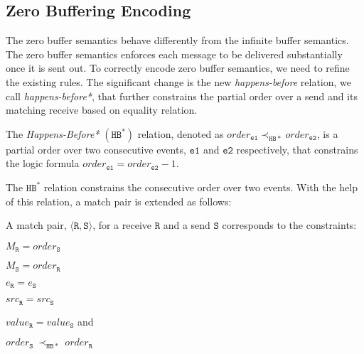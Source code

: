 





\subsection{Zero Buffering Encoding}
The zero buffer semantics behave differently from the infinite buffer semantics.  The zero buffer semantics enforces each message to be delivered substantially once it is sent out. To correctly encode zero buffer semantics, we need to refine the existing rules. The significant change is the new \emph{happens-before} relation, we call \textit{happens-before*}, that further constrains the partial order over a send and its matching receive based on equality relation. 

\begin{definition}
The \emph{Happens-Before*} $(\mathtt{HB^*})$ relation, denoted as
$\mathit{order}_\mathtt{e1} \mathrm{\prec_\mathtt{HB*}} \mathit{order}_\mathtt{e2}$, is a partial order over two consecutive events, $\mathtt{e1}$ and $\mathtt{e2}$ respectively, that constrains the logic formula $\mathit{order}_\mathtt{e1} =  \mathit{order}_\mathtt{e2} - 1$.
\label{def:hb*}
\end{definition}

The $\mathtt{HB^*}$ relation constrains the consecutive order over two events. With the help of this relation, a match pair is extended as follows: 

\begin{definition} \label{def:match*}
A match pair, $\langle\mathtt{R}, \mathtt{S}\rangle$, for a receive
$\mathtt{R}$ and a send $\mathtt{S}$ corresponds to the constraints:
\begin{compactenum}
\item $M_{\mathtt{R}} = \mathit{order}_{\mathtt{S}}$
\item $M_{\mathtt{S}} = \mathit{order}_{\mathtt{R}}$
\item $e_{\mathtt{R}} = e_{\mathtt{S}}$
\item $src_\mathtt{R} = src_\mathtt{S}$
\item $\mathit{value}_{\mathtt{R}} = \mathit{value}_{\mathtt{S}}$ and
\item $\mathit{order}_{\mathtt{S}}\ \mathrm{\prec_\mathtt{HB*}}\ \mathit{order}_{\mathtt{R}}$
\end{compactenum}
\end{definition}

